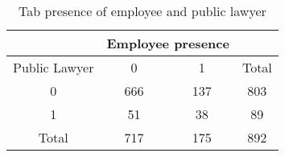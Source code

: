 \documentclass[11pt]{article}
\begin{document}
\begin{table}[H]
  \centering
  \caption{Tab presence of employee and public lawyer}
\begin{tabular}{rccr}
\toprule
      & \multicolumn{2}{c}{Employee presence} &  \\
\midrule
\multicolumn{1}{c}{Public Lawyer} & 0     & 1     & \multicolumn{1}{c}{Total} \\
\multicolumn{1}{c}{0} & 666   & 137   & \multicolumn{1}{c}{803} \\
\multicolumn{1}{c}{1} & 51    & 38    & \multicolumn{1}{c}{89} \\
\multicolumn{1}{c}{Total} & 717   & 175   & \multicolumn{1}{c}{892} \\
\bottomrule
\end{tabular}%

\end{table}%




\begin{center}
\scriptsize{}
\end{center}
\end{document}
